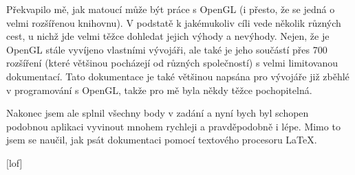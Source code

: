 \documentclass[a4paper, 11pt]{report}
\begin{document}
Překvapilo mě, jak matoucí může být práce s OpenGL (i přesto, že se jedná o velmi rozšířenou knihovnu). V podstatě k jakémukoliv cíli vede několik různých cest, u nichž jde velmi těžce dohledat jejich výhody a nevýhody. Nejen, že je OpenGL stále vyvíjeno vlastními vývojáři, ale také je jeho součástí přes 700 rozšíření (které většinou pocházejí od různých společností) s velmi limitovanou dokumentací. Tato dokumentace je také většinou napsána pro vývojáře již zběhlé v programování s OpenGL, takže pro mě byla někdy těžce pochopitelná.

Nakonec jsem ale splnil všechny body v zadání a nyní bych byl schopen podobnou aplikaci vyvinout mnohem rychleji a pravděpodobně i lépe. Mimo to jsem se naučil, jak psát dokumentaci pomocí textového procesoru \LaTeX.

\renewcommand{\bibpreamble}{
This software is based in part on the work of the Independent JPEG Group.}

\begin{flushleft}
    \makeatletter
        
        
    \makeatother
\end{flushleft}

\clearpage
{
    \pagestyle{lof}
    [lof]{}
    \listoffigures
    \thispagestyle{lof}
}
\end{document}
